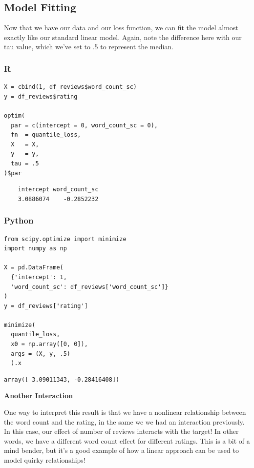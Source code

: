 \documentclass[
  letterpaper,
]{krantz}
\begin{document}
\subsection{Model Fitting}\label{sec-quantile-model}

Now that we have our data and our loss function, we can fit the model
almost exactly like our standard linear model. Again, note the
difference here with our tau value, which we've set to .5 to represent
the median.

\subsubsection{R}

\begin{verbatim}
X = cbind(1, df_reviews$word_count_sc)
y = df_reviews$rating

optim(
  par = c(intercept = 0, word_count_sc = 0),
  fn  = quantile_loss,
  X   = X,
  y   = y,
  tau = .5
)$par
\end{verbatim}

\begin{verbatim}
    intercept word_count_sc 
    3.0886074    -0.2852232 
\end{verbatim}

\subsubsection{Python}

\begin{verbatim}
from scipy.optimize import minimize
import numpy as np

X = pd.DataFrame(
  {'intercept': 1, 
  'word_count_sc': df_reviews['word_count_sc']}
)
y = df_reviews['rating']

minimize(
  quantile_loss, 
  x0 = np.array([0, 0]), 
  args = (X, y, .5)
  ).x
\end{verbatim}

\begin{verbatim}
array([ 3.09011343, -0.28416408])
\end{verbatim}

\begin{tcolorbox}[enhanced jigsaw, opacityback=0, leftrule=.75mm, bottomrule=.15mm, colframe=quarto-callout-tip-color-frame, rightrule=.15mm, breakable, left=2mm, colback=white, arc=.35mm, toprule=.15mm]

\vspace{-3mm}\textbf{Another Interaction}\vspace{3mm}

One way to interpret this result is that we have a nonlinear
relationship between the word count and the rating, in the same we we
had an interaction previously. In this case, our effect of number of
reviews interacts with the target! In other words, we have a different
word count effect for different ratings. This is a bit of a mind bender,
but it's a good example of how a linear approach can be used to model
quirky relationships!

\end{tcolorbox}
\end{document}

